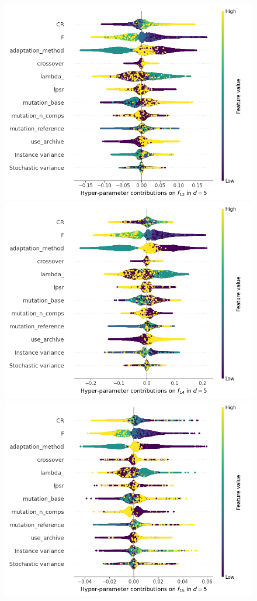 \begin{figure}[t]
	\includegraphics[height=0.15\textheight,trim=0mm 0mm 30mm 0mm,clip]{de_img_new/img_summary_f13_d5.png}
	\includegraphics[height=0.15\textheight,trim=60mm 0mm 30mm 0mm,clip]{de_img_new/img_summary_f14_d5.png}
	\includegraphics[height=0.15\textheight,trim=60mm 0mm 30mm 0mm,clip]{de_img_new/img_summary_f15_d5.png}

\end{figure}
